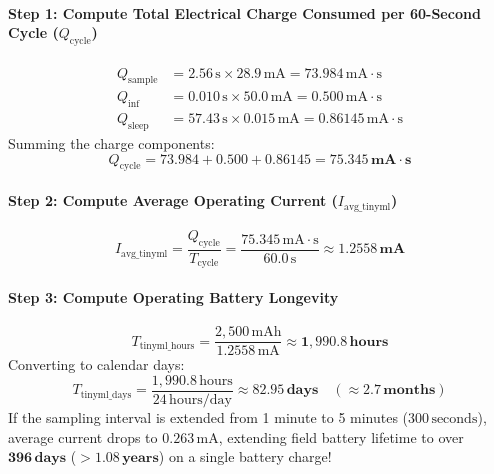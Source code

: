 \begin{example}
\paragraph{Step 1: Compute Total Electrical Charge Consumed per 60-Second Cycle ($Q_{\text{cycle}}$)}
\begin{align*}
Q_{\text{sample}} &= 2.56\,\text{s} \times 28.9\,\text{mA} = 73.984\,\text{mA}\cdot\text{s} \\
Q_{\text{inf}} &= 0.010\,\text{s} \times 50.0\,\text{mA} = 0.500\,\text{mA}\cdot\text{s} \\
Q_{\text{sleep}} &= 57.43\,\text{s} \times 0.015\,\text{mA} = 0.86145\,\text{mA}\cdot\text{s}
\end{align*}
Summing the charge components:
\begin{equation*}
Q_{\text{cycle}} = 73.984 + 0.500 + 0.86145 = \mathbf{75.345\,\text{mA}\cdot\text{s}}
\end{equation*}

\paragraph{Step 2: Compute Average Operating Current ($I_{\text{avg\_tinyml}}$)}
\begin{equation*}
I_{\text{avg\_tinyml}} = \frac{Q_{\text{cycle}}}{T_{\text{cycle}}} = \frac{75.345\,\text{mA}\cdot\text{s}}{60.0\,\text{s}} \approx \mathbf{1.2558\,\text{mA}}
\end{equation*}

\paragraph{Step 3: Compute Operating Battery Longevity}
\begin{equation*}
T_{\text{tinyml\_hours}} = \frac{2{,}500\,\text{mAh}}{1.2558\,\text{mA}} \approx \mathbf{1{,}990.8\,\text{hours}}
\end{equation*}
Converting to calendar days:
\begin{equation*}
T_{\text{tinyml\_days}} = \frac{1{,}990.8\,\text{hours}}{24\,\text{hours/day}} \approx \mathbf{82.95\,\text{days}} \quad (\approx \mathbf{2.7\,\text{months}})
\end{equation*}
If the sampling interval is extended from 1 minute to 5 minutes ($300\,\text{seconds}$), average current drops to $0.263\,\text{mA}$, extending field battery lifetime to over $\mathbf{396\,\text{days}}$ ($> \mathbf{1.08\,\text{years}}$) on a single battery charge!
\end{example}

